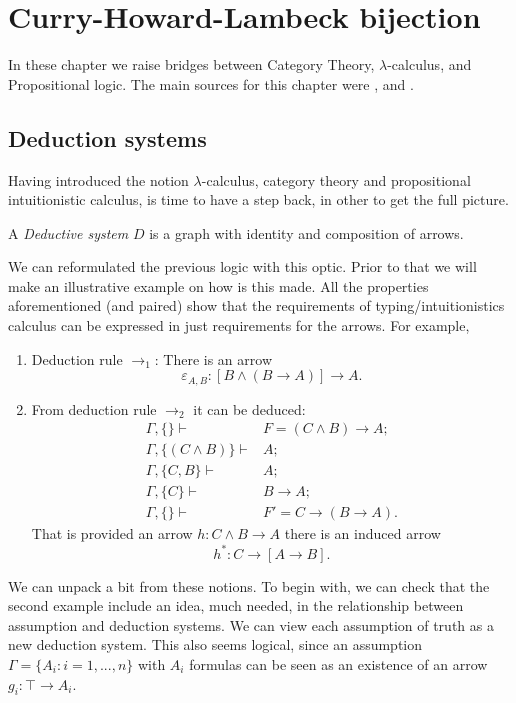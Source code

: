 
\chapter{Curry-Howard-Lambeck bijection}
\thispagestyle{empty}
In these chapter we raise bridges between Category Theory, $\lambda$-calculus, and Propositional logic. The main sources for this chapter were  \cite{lambek1988introduction}, \cite{lambek1985cartesian} and \cite[Chapter 6]{selinger2008lecture}.\\


\section{Deduction systems}
Having introduced the notion $\lambda$-calculus, category theory and propositional intuitionistic calculus, is time to have a step back, in other to get the full picture.

\begin{definition}
  A \emph{Deductive system} $D$ is a graph  with identity and composition of arrows.
\end{definition}

We can reformulated the previous logic with this optic. Prior to that we will make an illustrative example on how is this made. All the properties aforementioned (and paired) show that the requirements of typing/intuitionistics calculus can be expressed in just requirements for the arrows. For example, 
\begin{example}
  \begin{enumerate}
  \item Deduction rule $\to_1$: There is an arrow $$\varepsilon_{A,B}: [B\land (B \to A)] \to A.$$
  \item From deduction rule $\to_2$ it can be deduced:
    \begin{align*}
      \Gamma,\{\} \vdash & F= (C\land B)\to A;\\
      \Gamma, \{(C\land B)\} \vdash & A;\\
      \Gamma, \{C, B\} \vdash & A;\\
      \Gamma, \{C\} \vdash & B\to A;\\
      \Gamma, \{\} \vdash & F'=C \to (B \to A).
    \end{align*}
    That is provided an arrow $h: C\land B \to A$ there is an induced arrow
    $$h^*:C \to [A\to B].$$
  \end{enumerate}
\end{example}

We can unpack a bit from these notions. To begin with, we can check that the second example include an idea, much needed, in the relationship between assumption and deduction systems. We can view each assumption of truth as a new deduction system. This also seems logical, since an assumption $\Gamma = \{A_i : i=1,...,n\}$  with $A_i$ formulas can be seen as an existence of an arrow $g_i: \top \to A_i$.\\

